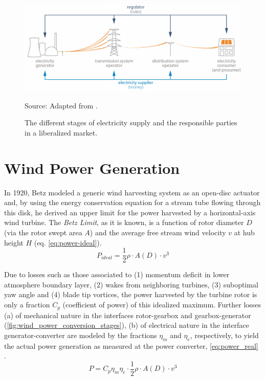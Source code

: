 \begin{figure}[H]%
   \centering
    \caption{The different stages of electricity supply and the responsible parties in a liberalized market.}
    \includegraphics[scale=0.35]{electricity_grid_players.png} \\
    \raggedright
    Source: Adapted from \cite{erbach2016market}.
   \label{fig:electricity_grid_players}
\end{figure}

\section{Wind Power Generation}

In 1920, Betz \cite{betz1920limit} modeled a generic wind harvesting system as an open-disc actuator and, by using the energy conservation equation for a stream tube flowing through this disk, he derived an upper limit for the power harvested by a horizontal-axis wind turbine. The \textit{Betz Limit}, as it is known, is a function of rotor diameter $D$ (via the rotor swept area $A$) and the average free stream wind velocity $v$ at hub height $H$ (eq. \ref{eq:power-ideal}).
\begin{equation}\label{eq:power-ideal}
P_{ideal} = \frac{1}{2}\rho \cdot A(D)\cdot v^3
\end{equation}

Due to losses such as those associated to (1) momentum deficit in lower atmosphere boundary layer, (2) wakes from neighboring turbines, (3) suboptimal yaw angle and (4) blade tip vortices, the power harvested by the turbine rotor is only a fraction $C_p$ (coefficient of power) of this idealized maximum. Further  losses (a) of mechanical nature in the interfaces rotor-gearbox and gearbox-generator (\ref{fig:wind_power_conversion_stages}), (b) of electrical nature in the interface generator-converter  are modeled by the fractions $\eta_{m}$ and $\eta_{e}$, respectively,  to yield the actual power generation as measured at the power converter, \ref{eq:power_real} \cite{albadi2009capacity}.
\begin{equation}\label{eq:power_real}
P = C_p\eta_{m} \eta_{e}  \cdot \frac{1}{2}\rho \cdot A(D)\cdot v^3
\end{equation}

